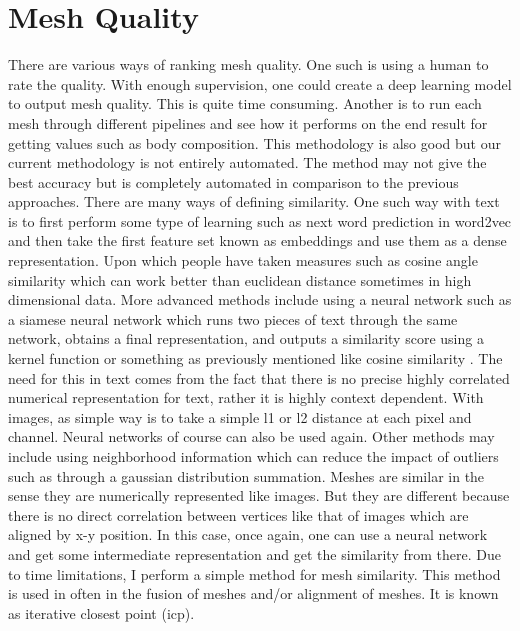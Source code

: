 \section{Mesh Quality}
There are various ways of ranking mesh quality. One such is using a human to rate the quality. With enough supervision, one could create a deep learning model to output mesh quality. This is quite time consuming. Another is to run each mesh through different pipelines and see how it performs on the end result for getting values such as body composition. This methodology is also good but our current methodology is not entirely automated. The method may not give the best accuracy but is completely automated in comparison to the previous approaches. There are many ways of defining similarity. One such way with text is to first perform some type of learning such as next word prediction in word2vec and then take the first feature set known as embeddings and use them as a dense representation. Upon which people have taken measures such as cosine angle similarity which can work better than euclidean distance sometimes in high dimensional data. More advanced methods include using a neural network such as a siamese neural network which runs two pieces of text through the same network, obtains a final representation, and outputs a similarity score using a kernel function or something as previously mentioned like cosine similarity \cite{bertinetto2016fully}. The need for this in text comes from the fact that there is no precise highly correlated numerical representation for text, rather it is highly context dependent. With images, as simple way is to take a simple l1 or l2 distance at each pixel and channel. Neural networks of course can also be used again. Other methods may include using neighborhood information which can reduce the impact of outliers such as through a gaussian distribution summation. Meshes are similar in the sense they are numerically represented like images. But they are different because there is no direct correlation between vertices like that of images which are aligned by x-y position. In this case, once again, one can use a neural network and get some intermediate representation and get the similarity from there. Due to time limitations, I perform a simple method for mesh similarity. This method is used in often in the fusion of meshes and/or alignment of meshes. It is known as iterative closest point (icp).


